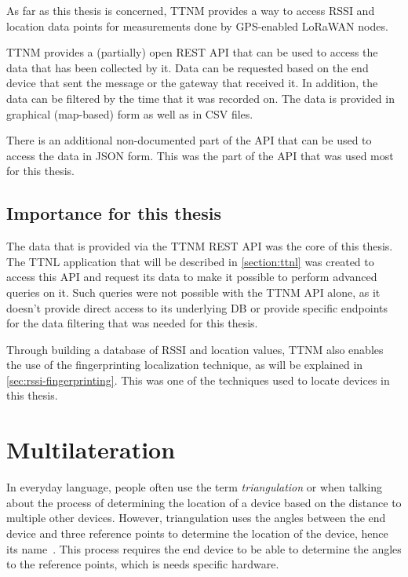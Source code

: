 As far as this thesis is concerned, \acl{TTNM} provides a way to access \ac{RSSI} and location data points for measurements done by \ac{GPS}-enabled \ac{LoRaWAN} nodes.

\ac{TTNM} provides a (partially) open \ac{REST} \ac{API} that can be used to access the data that has been collected by it.
Data can be requested based on the end device that sent the message or the gateway that received it.
In addition, the data can be filtered by the time that it was recorded on.
The data is provided in graphical (map-based) form as well as in \ac{CSV} files.

There is an additional non-documented part of the \ac{API} that can be used to access the data in \ac{JSON} form.
This was the part of the \ac{API} that was used most for this thesis.

\subsection{Importance for this thesis}\label{sec:ttn-mapper-importance}

The data that is provided via the \ac{TTNM} \ac{REST} \ac{API} was the core of this thesis.
The \ac{TTNL} application that will be described in \cref{section:ttnl} was created to access this \ac{API} and request its data to make it possible to perform advanced queries on it.
Such queries were not possible with the \ac{TTNM} \ac{API} alone, as it doesn't provide direct access to its underlying \ac{DB} or provide specific endpoints for the data filtering that was needed for this thesis.

Through building a database of \ac{RSSI} and location values, \ac{TTNM} also enables the use of the fingerprinting localization technique, as will be explained in \cref{sec:rssi-fingerprinting}.
This was one of the techniques used to locate devices in this thesis.

\section{Multilateration}\label{sec:multilateration-basics}

In everyday language, people often use the term \emph{triangulation} or when talking about the process of determining the location of a device based on the distance to multiple other devices.
However, triangulation uses the angles between the end device and three reference points to determine the location of the device, hence its name~\cite{yaro_multiangulation_2017}.
This process requires the end device to be able to determine the angles to the reference points, which is needs specific hardware.

